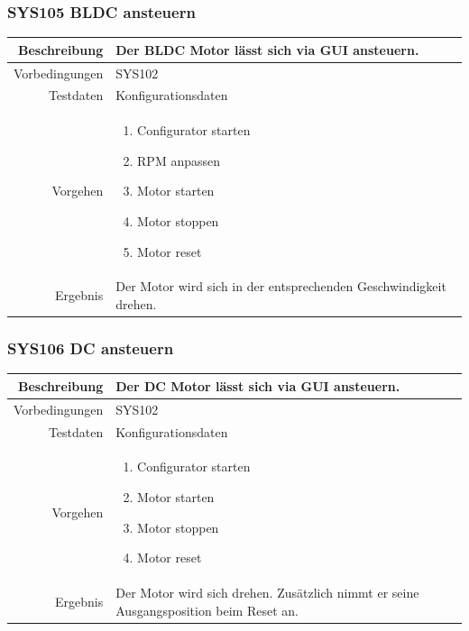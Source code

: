 \subsubsection{SYS105 BLDC ansteuern}
\begin{table}[h!]
	\renewcommand{\arraystretch}{1.5}
	\begin{tabular}{|r|p{14cm}|}
		\hline Beschreibung & Der BLDC Motor lässt sich via GUI ansteuern. \\ 
		\hline Vorbedingungen & SYS102 \\ 
		\hline Testdaten & Konfigurationsdaten \\ 
		\hline Vorgehen & 
		\begin{enumerate}
			\item Configurator starten
			\item RPM anpassen
			\item Motor starten
			\item Motor stoppen
			\item Motor reset
		\end{enumerate} \\ 
		\hline Ergebnis & Der Motor wird sich in der entsprechenden Geschwindigkeit drehen. \\ 
		\hline 
	\end{tabular}
\end{table}
\newpage

\subsubsection{SYS106 DC ansteuern }
\begin{table}[h!]
	\renewcommand{\arraystretch}{1.5}
	\begin{tabular}{|r|p{14cm}|}
		\hline Beschreibung & Der DC Motor lässt sich via GUI ansteuern. \\ 
		\hline Vorbedingungen & SYS102 \\ 
		\hline Testdaten & Konfigurationsdaten \\ 
		\hline Vorgehen & 
		\begin{enumerate}
			\item Configurator starten
			\item Motor starten
			\item Motor stoppen
			\item Motor reset
		\end{enumerate} \\ 
		\hline Ergebnis & Der Motor wird sich drehen. Zusätzlich nimmt er seine Ausgangsposition beim Reset an.\\ 
		\hline 
	\end{tabular}
\end{table}

